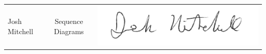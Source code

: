 \documentclass[]{article}
\begin{document}
\begin{tabular}{l c r}
	Josh Mitchell & Sequence Diagrams & 
	\includegraphics[scale=0.2]{../Resources/Signature/Josh-Sig.png} \\
\end{tabular}
\end{document}
